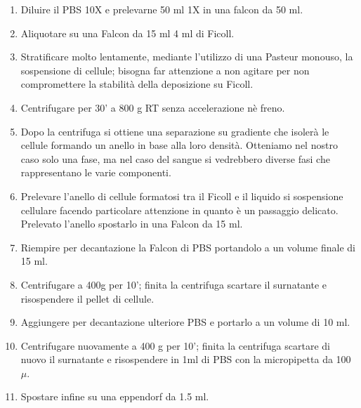 \begin{enumerate}
    \item Diluire il PBS 10X e prelevarne 50 ml 1X in una falcon da 50 ml.
    \item Aliquotare su una Falcon da 15 ml 4 ml di Ficoll.
    \item Stratificare molto lentamente, mediante l'utilizzo di una Pasteur monouso, 
    la sospensione di cellule; bisogna far attenzione a non agitare per non compromettere 
    la stabilità della deposizione su Ficoll.
    \item Centrifugare per 30' a 800 g RT senza accelerazione nè freno.
    \item Dopo la centrifuga si ottiene una separazione su gradiente che isolerà le cellule
    formando un anello in base alla loro densità. Otteniamo nel nostro caso solo una fase, 
    ma nel caso del sangue si vedrebbero diverse fasi che rappresentano le varie componenti.
    \item Prelevare l'anello di cellule formatosi tra il Ficoll e il liquido si sospensione 
    cellulare facendo particolare attenzione in quanto è un passaggio delicato. 
    Prelevato l'anello spostarlo in una Falcon da 15 ml.
    \item Riempire per decantazione la Falcon di PBS portandolo a un volume finale di 15 ml.
    \item Centrifugare a 400g per 10'; finita la centrifuga scartare il surnatante 
    e risospendere il pellet di cellule.
    \item Aggiungere per decantazione ulteriore PBS e portarlo a un volume di 10 ml.
    \item Centrifugare nuovamente a 400 g per 10'; finita la centrifuga scartare di nuovo 
    il surnatante e risospendere in 1ml di PBS con la micropipetta da 100 $\mu$.
    \item Spostare infine su una eppendorf da 1.5 ml.
\end{enumerate}

